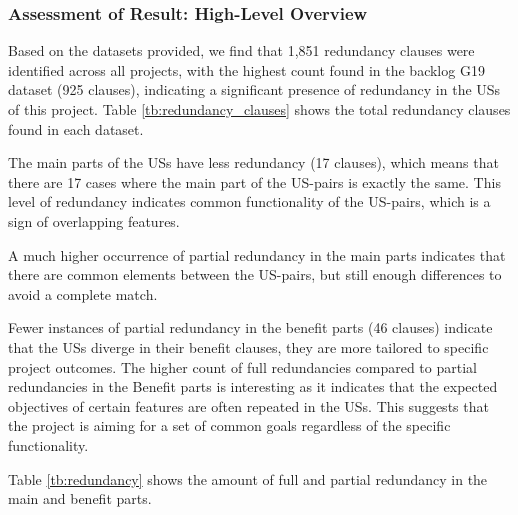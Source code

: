 \subsubsection*{Assessment of Result: High-Level Overview}
Based on the datasets provided, we find that 1,851 redundancy clauses were identified across all projects, with the highest count found in the backlog G19 dataset (925 clauses), indicating a significant presence of redundancy in the USs of this project. Table \ref{tb:redundancy_clauses} shows the total redundancy clauses found in each dataset.

The main parts of the USs have less redundancy (17 clauses), which means that there are 17 cases where the main part of the US-pairs is exactly the same. This level of redundancy indicates common functionality of the US-pairs, which is a sign of overlapping features. 

A much higher occurrence of partial redundancy in the main parts indicates that there are common elements between the US-pairs, but still enough differences to avoid a complete match. 

Fewer instances of partial redundancy in the benefit parts (46 clauses) indicate that the USs diverge in their benefit clauses, they are more tailored to specific project outcomes. The higher count of full redundancies compared to partial redundancies in the Benefit parts is interesting as it indicates that the expected objectives of certain features are often repeated in the USs. This suggests that the project is aiming for a set of common goals regardless of the specific functionality.

Table \ref{tb:redundancy} shows the amount of full and partial redundancy in the main and benefit parts.

